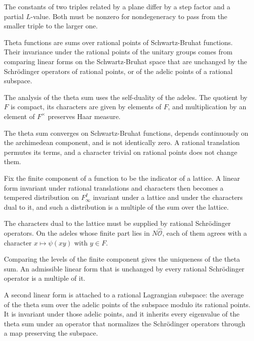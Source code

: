 The constants of two triples related by a plane differ by a step factor and a
partial $L$-value. Both must be nonzero for nondegeneracy to pass from the
smaller triple to the larger one.

Theta functions are sums over rational points of Schwartz-Bruhat functions. Their
invariance under the rational points of the unitary groups comes from comparing
linear forms on the Schwartz-Bruhat space that are unchanged by the Schrödinger
operators of rational points, or of the adelic points of a rational subspace.

The analysis of the theta sum uses the self-duality of the adeles. The quotient
by $F$ is compact, its characters are given by elements of $F$, and
multiplication by an element of $F^\times$ preserves Haar measure.

The theta sum converges on Schwartz-Bruhat functions, depends continuously on
the archimedean component, and is not identically zero. A rational translation
permutes its terms, and a character trivial on rational points does not change
them.

Fix the finite component of a function to be the indicator of a lattice. A linear
form invariant under rational translations and characters then becomes a
tempered distribution on $F_\infty^I$ invariant under a lattice and under the
characters dual to it, and such a distribution is a multiple of the sum over the
lattice.

The characters dual to the lattice must be supplied by rational Schrödinger
operators. On the adeles whose finite part lies in $N\widehat{\mathcal O}$, each of
them agrees with a character $x\mapsto\psi(xy)$ with $y\in F$.

Comparing the levels of the finite component gives the uniqueness of the theta
sum. An admissible linear form that is unchanged by every rational Schrödinger
operator is a multiple of it.

A second linear form is attached to a rational Lagrangian subspace: the average
of the theta sum over the adelic points of the subspace modulo its rational
points. It is invariant under those adelic points, and it inherits every
eigenvalue of the theta sum under an operator that normalizes the Schrödinger
operators through a map preserving the subspace.

